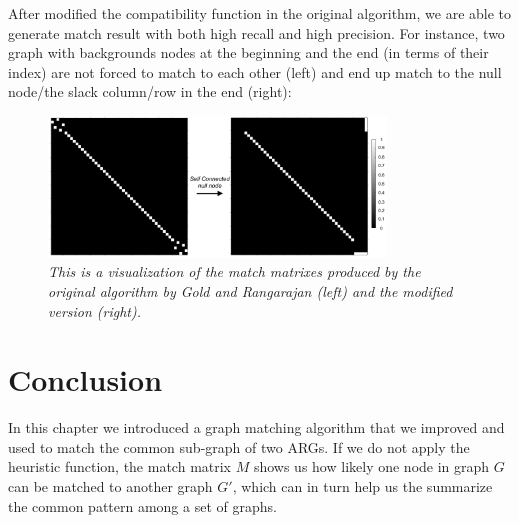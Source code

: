 After modified the compatibility function in the original algorithm, we are able to generate match result with both high recall and high precision. For instance, two graph with backgrounds nodes at the beginning and the end (in terms of their index) are not forced to match to each other (left) and end up match to the null node/the slack column/row in the end (right):
\begin{figure}[h]
	\centering
	\captionsetup{justification=centering}
	\includegraphics[width=0.8\textwidth]{figs/null_node_improve.png}
	\caption[Caption for LOF]{\emph{This is a visualization of the match matrixes produced by the original algorithm by Gold and Rangarajan (left) and the modified version (right).}}
	\label{fig:null_node_improve}
\end{figure}

\section{Conclusion}


In this chapter we introduced a graph matching algorithm that we improved and used to match the common sub-graph of two ARGs. If we do not apply the heuristic function, the match matrix $M$ shows us how likely one node in graph $G$ can be matched to another graph $G'$, which can in turn help us the summarize the common pattern among a set of graphs.

